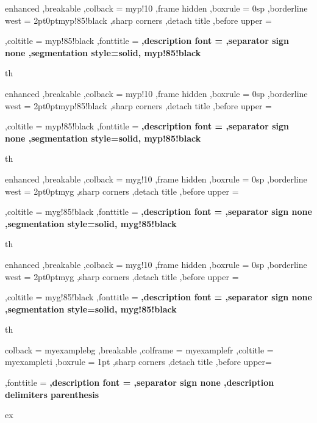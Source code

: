 {%
	enhanced
	,breakable
	,colback = myp!10
	,frame hidden
	,boxrule = 0sp
	,borderline west = {2pt}{0pt}{myp!85!black}
	,sharp corners
	,detach title
	,before upper = \tcbtitle\par\smallskip
	,coltitle = myp!85!black
	,fonttitle = \bfseries\sffamily
	,description font = \mdseries
	,separator sign none
	,segmentation style={solid, myp!85!black}
}
{th}
{%
	enhanced
	,breakable
	,colback = myp!10
	,frame hidden
	,boxrule = 0sp
	,borderline west = {2pt}{0pt}{myp!85!black}
	,sharp corners
	,detach title
	,before upper = \tcbtitle\par\smallskip
	,coltitle = myp!85!black
	,fonttitle = \bfseries\sffamily
	,description font = \mdseries
	,separator sign none
	,segmentation style={solid, myp!85!black}
}
{th}


{%
	enhanced
	,breakable
	,colback = myg!10
	,frame hidden
	,boxrule = 0sp
	,borderline west = {2pt}{0pt}{myg}
	,sharp corners
	,detach title
	,before upper = \tcbtitle\par\smallskip
	,coltitle = myg!85!black
	,fonttitle = \bfseries\sffamily
	,description font = \mdseries
	,separator sign none
	,segmentation style={solid, myg!85!black}
}
{th}


{%
	enhanced
	,breakable
	,colback = myg!10
	,frame hidden
	,boxrule = 0sp
	,borderline west = {2pt}{0pt}{myg}
	,sharp corners
	,detach title
	,before upper = \tcbtitle\par\smallskip
	,coltitle = myg!85!black
	,fonttitle = \bfseries\sffamily
	,description font = \mdseries
	,separator sign none
	,segmentation style={solid, myg!85!black}
}
{th}


{%
	colback = myexamplebg
	,breakable
	,colframe = myexamplefr
	,coltitle = myexampleti
	,boxrule = 1pt
	,sharp corners
	,detach title
	,before upper=\tcbtitle\par\smallskip
	,fonttitle = \bfseries
	,description font = \mdseries
	,separator sign none
	,description delimiters parenthesis
}
{ex}

